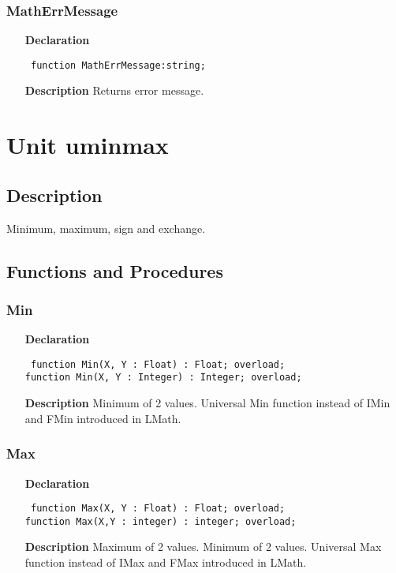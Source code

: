 \documentclass[12pt,a4paper,oneside]{report}
\newcommand{\lmath}[1]{   %
	\marginpar{\vspace{#1} 
		\begin{flushright}
			LMath
	\end{flushright} }
}
\newcommand{\declarationitem}[1]{\textbf{#1}}
\newcommand{\descriptiontitle}[1]{\textbf{#1}}
\newcommand{\code}[1]{\texttt{#1}}
\begin{document}
\subsubsection{MathErrMessage}
\lmath{-24pt}
\label{uErrors-MathErrMessage}
\begin{itemize}\item[\declarationitem{Declaration}\hfill]
	\begin{flushleft}
		\code{
			function MathErrMessage:string;}
	\end{flushleft}
	\item[\descriptiontitle{Description}]
	Returns error message.
\end{itemize}

\section{Unit uminmax}
\label{uminmax}
\subsection{Description}
Minimum, maximum, sign and exchange. 
\subsection{Functions and Procedures}
\subsubsection{Min}\lmath{-24pt}
\label{uminmax-Min}
\begin{itemize}\item[\declarationitem{Declaration}\hfill]
	\begin{flushleft}
		\code{
			function Min(X, Y : Float) : Float; overload;\\
			function Min(X, Y : Integer) : Integer; overload;}
	\end{flushleft}
	\item[\descriptiontitle{Description}]
	Minimum of 2 values. Universal Min function instead of IMin and FMin introduced in LMath.
\end{itemize}
\subsubsection{Max}\lmath{-24pt}
\label{uminmax-Max}
\begin{itemize}\item[\declarationitem{Declaration}\hfill]
	\begin{flushleft}
		\code{
			function Max(X, Y : Float) : Float; overload;\\
			function Max(X,Y : integer) : integer; overload;}
	\end{flushleft}
	\item[\descriptiontitle{Description}]
	Maximum of 2 values. 	Minimum of 2 values. Universal Max function instead of IMax and FMax introduced in LMath.
	
\end{itemize}
\end{document}
